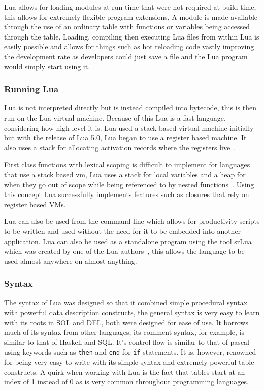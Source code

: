 \documentclass[11pt,a4paper,titlepage]{article}
\begin{document}
			Lua allows for loading modules at run time that were not required at build time, this allows for extremely flexible program extensions. A module is made available through the use of an ordinary table with functions or variables being accessed through the table. Loading, compiling then executing Lua files from within Lua is easily possible and allows for things such as hot reloading code vastly improving the development rate as developers could just save a file and the Lua program would simply start using it.
				
		\subsubsection{Running Lua}
			Lua is not interpreted directly but is instead compiled into bytecode, this is then run on the Lua virtual machine. Because of this Lua is a fast language, considering how high level it is. Lua used a stack based virtual machine initially but with the release of Lua 5.0, Lua began to use a register based machine. It also uses a stack for allocating activation records where the registers live~\cite{IerusalimschyImplementation}.

			First class functions with lexical scoping is difficult to implement for languages that use a stack based vm, Lua uses a stack for local variables and a heap for when they go out of scope while being referenced to by nested functions~\cite{IerusalimschyImplementation}. Using this concept Lua successfully implements features such as closures that rely on register based VMs.

			Lua can also be used from the command line which allows for productivity scripts to be written and used without the need for it to be embedded into another application. Lua can also be used as a standalone program using the tool srLua which was created by one of the Lua authors~\cite{tecgrafLibAndTools}, this allows the language to be used almost anywhere on almost anything.

		\subsubsection{Syntax}
			The syntax of Lua was designed so that it combined simple procedural syntax with powerful data description constructs, the general syntax is very easy to learn with its roots in SOL and DEL, both were designed for ease of use. It borrows much of its syntax from other languages, its comment syntax, for example, is similar to that of Haskell and SQL. It's control flow is similar to that of pascal using keywords such as \texttt{then} and \texttt{end} for \texttt{if} statements. It is, however, renowned for being very easy to write with its simple syntax and extremely powerful table constructs. A quirk when working with Lua is the fact that tables start at an index of 1 instead of 0 as is very common throughout programming languages.
\end{document}
